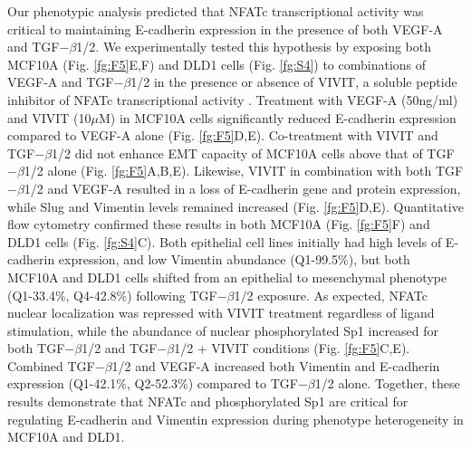 \documentclass[12pt]{article}
\begin{document}
Our phenotypic analysis predicted that NFATc transcriptional activity was critical to maintaining E-cadherin expression in the presence of both VEGF-A and TGF$-\beta$1/2.
We experimentally tested this hypothesis by exposing both MCF10A (Fig. \ref{fg:F5}E,F) and DLD1 cells (Fig. \ref{fg:S4}) to combinations of VEGF-A and TGF$-\beta$1/2 in the presence or absence of VIVIT, a soluble peptide inhibitor of NFATc transcriptional activity \citep{Aramburu:1999if}.
Treatment with VEGF-A (50ng/ml) and VIVIT (10$\mu$M) in MCF10A cells significantly reduced E-cadherin expression compared to VEGF-A alone (Fig. \ref{fg:F5}D,E).
Co-treatment with VIVIT and TGF$-\beta$1/2 did not enhance EMT capacity of MCF10A cells above that of TGF$-\beta$1/2 alone (Fig. \ref{fg:F5}A,B,E).
Likewise, VIVIT in combination with both TGF$-\beta$1/2 and VEGF-A resulted in a loss of E-cadherin gene and protein expression, while Slug and Vimentin levels remained increased (Fig. \ref{fg:F5}D,E).
Quantitative flow cytometry confirmed these results in both MCF10A (Fig. \ref{fg:F5}F) and DLD1 cells (Fig. \ref{fg:S4}C).
Both epithelial cell lines initially had high levels of E-cadherin expression, and low Vimentin abundance (Q1-99.5\%), but both MCF10A and DLD1 cells shifted from an epithelial to mesenchymal phenotype (Q1-33.4\%, Q4-42.8\%) following TGF$-\beta$1/2 exposure.
As expected, NFATc nuclear localization was repressed with VIVIT treatment regardless of ligand stimulation, while the abundance of nuclear phosphorylated Sp1 increased for both TGF$-\beta$1/2 and TGF$-\beta$1/2 + VIVIT conditions (Fig. \ref{fg:F5}C,E).
Combined TGF$-\beta$1/2 and VEGF-A increased both Vimentin and E-cadherin expression (Q1-42.1\%, Q2-52.3\%) compared to TGF$-\beta$1/2 alone.
Together, these results demonstrate that NFATc and phosphorylated Sp1 are critical for regulating E-cadherin and Vimentin expression during phenotype heterogeneity in MCF10A and DLD1.
\end{document}
